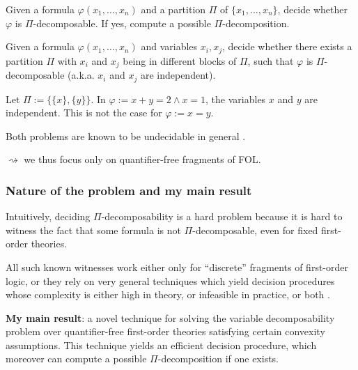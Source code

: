 \documentclass[handout]{beamer}
\def\Mstruct{\mathcal{M}}
\def\Q{\mathbb{Q}}
\begin{document}
\begin{frame}

\begin{problem}
	Given a formula $ \varphi(x_1, \dots, x_n) $ and a partition $ \Pi $ of $ \{x_1, \dots, x_n\} $, decide whether $ \varphi $ is $ \Pi $-decomposable. If yes, compute a possible $ \Pi $-decomposition.
\end{problem}

\begin{problem}
	Given a formula $ \varphi(x_1, \dots, x_n) $ and variables $ x_i, x_j $, decide whether there exists a partition $ \Pi $ with $ x_i $ and $ x_j $ being in different blocks of $ \Pi $, such that $ \varphi $ is $ \Pi $-decomposable (a.k.a. $ x_i $ and $ x_j $ are independent).
\end{problem}

\begin{example}[$ \Mstruct = (\Q, +, <, =, 0, 1) $]
	Let $ \Pi := \{\{x\}, \{y\}\} $. In $ \varphi := x + y = 2 \wedge x = 1 $, the variables $ x $ and $ y $ are independent. This is not the case for $ \varphi := x = y $.
\end{example}

Both problems are known to be \alert{undecidable} in general \cite{libkin:2003}.

\vspace{2pt}

$ \rightsquigarrow $ we thus focus only on quantifier-free fragments of FOL.

\end{frame}

\begin{frame}
	\frametitle{Nature of the problem and my main result}
	
	Intuitively, deciding $ \Pi $-decomposability is a hard problem because it is hard to witness the fact that some formula is not $ \Pi $-decomposable, even for fixed first-order theories.
	
	\vspace{5pt}
	
	All such known witnesses work either only for ``discrete'' fragments of first-order logic, or they rely on very general techniques which yield decision procedures whose complexity is either high in theory, or infeasible in practice, or both \cite{libkin:2000, libkin:2003, hague:2020, markgraf:2021, veanes:2017}.
	
	\vspace{5pt}
	
	\textbf{My main result}: a novel technique for solving the variable decomposability problem over quantifier-free first-order theories satisfying certain convexity assumptions. This technique yields an efficient decision procedure, which moreover can compute a possible $ \Pi $-decomposition if one exists.
\end{frame}
\end{document}
